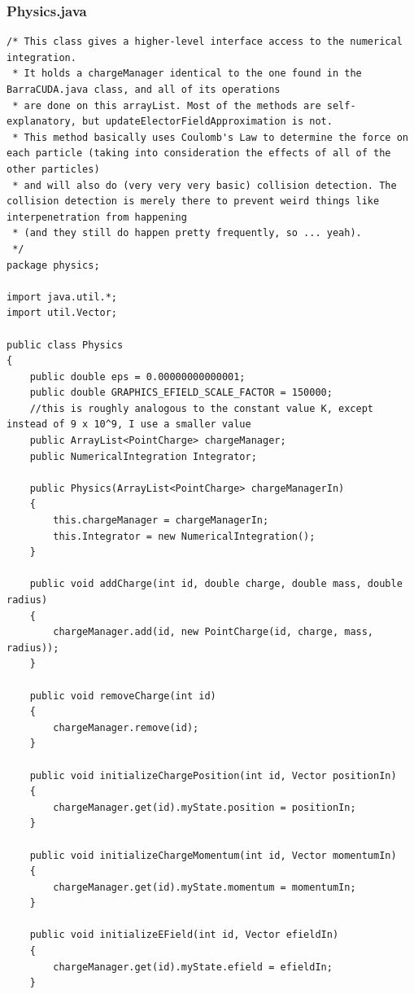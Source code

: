 \documentclass[10pt]{article}
\begin{document}
\subsubsection{Physics.java}
\begin{verbatim}
/* This class gives a higher-level interface access to the numerical integration.
 * It holds a chargeManager identical to the one found in the BarraCUDA.java class, and all of its operations
 * are done on this arrayList. Most of the methods are self-explanatory, but updateElectorFieldApproximation is not.
 * This method basically uses Coulomb's Law to determine the force on each particle (taking into consideration the effects of all of the other particles)
 * and will also do (very very very basic) collision detection. The collision detection is merely there to prevent weird things like interpenetration from happening 
 * (and they still do happen pretty frequently, so ... yeah).
 */
package physics;

import java.util.*;
import util.Vector;

public class Physics 
{
	public double eps = 0.00000000000001;
	public double GRAPHICS_EFIELD_SCALE_FACTOR = 150000; 
	//this is roughly analogous to the constant value K, except instead of 9 x 10^9, I use a smaller value
	public ArrayList<PointCharge> chargeManager;
	public NumericalIntegration Integrator;

	public Physics(ArrayList<PointCharge> chargeManagerIn)
	{
		this.chargeManager = chargeManagerIn;
		this.Integrator = new NumericalIntegration();
	}

	public void addCharge(int id, double charge, double mass, double radius)
	{
		chargeManager.add(id, new PointCharge(id, charge, mass, radius));
	}

	public void removeCharge(int id)
	{
		chargeManager.remove(id);
	}

	public void initializeChargePosition(int id, Vector positionIn)
	{
		chargeManager.get(id).myState.position = positionIn;
	}

	public void initializeChargeMomentum(int id, Vector momentumIn)
	{
		chargeManager.get(id).myState.momentum = momentumIn;
	}

	public void initializeEField(int id, Vector efieldIn)
	{
		chargeManager.get(id).myState.efield = efieldIn;
	}


\end{verbatim}
\end{document}
